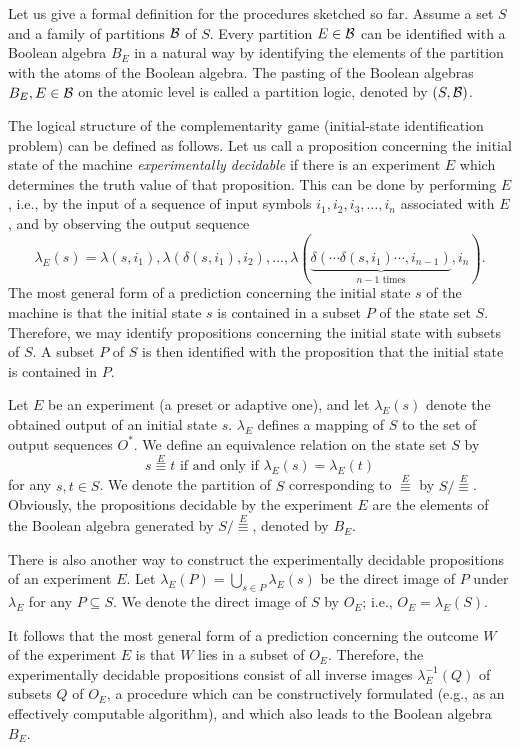\documentclass [11pt]{llncs}
\begin{document}
Let us give a formal definition for the procedures sketched so far.
Assume a set $S$ and a family of partitions ${\cal B}$ of $S$.
Every partition $E\in {\cal B}$ can be identified with a Boolean
algebra $B_E$ in a natural way by identifying the elements of the
partition with the atoms of the Boolean algebra.
The pasting of the Boolean algebras $B_E,E \in {\cal B}$ on the atomic
level is called a partition logic, denoted by $(S,{\cal B})$.


The logical structure of the complementarity game (initial-state
identification problem) can
be defined as follows. Let us call a proposition concerning the initial
state of the machine
{\em experimentally decidable} if there is an experiment $E$ which
determines the truth value of that proposition.
This can be done by performing $E$, i.e., by the input of a sequence of
input symbols $i_1,i_2,i_3,\ldots ,i_n$ associated with $E$, and by
observing the output sequence
$$\lambda_E(s)=\lambda(s,i_1),\lambda(\delta (s,i_1),i_2), \ldots
,\lambda(\underbrace{\delta
(\cdots \delta (s,i_1)\cdots ,i_{n-1})}_{n-1 \mbox{ times}},i_n).$$
The most general form of a prediction concerning the
initial state $s$
of the machine is that the initial state $s$ is contained in a subset
$P$ of the state set $S$.
Therefore, we may identify propositions concerning the initial state
with subsets of $S$.
A subset $P$ of $S$ is then  identified with the proposition that the
initial state is contained in $P$.

Let $E$ be an experiment (a preset or adaptive one), and let
$\lambda_E(s)$
denote the obtained output of an initial
state $s$.
$\lambda_E$ defines a mapping of $S$ to the set of output sequences
$O^*$. We define an equivalence relation on the state set $S$ by
$$s \stackrel{E}{\equiv} t \mbox{ if and only if }\lambda_E(s) =
\lambda_E(t)$$ for any $s,t \in S$.
We denote the partition of $S$ corresponding to $\stackrel{E}{\equiv}$
by $S/\stackrel{E}{\equiv}$.
Obviously, the propositions decidable by the experiment $E$ are
the elements of the Boolean algebra generated by
$S/\stackrel{E}{\equiv}$, denoted by $B_E$.

There is also another way to construct the experimentally decidable
propositions of an experiment $E$.
Let $\lambda_E(P)  = \bigcup\limits_{s \in P}\lambda_E(s)$ be the direct
image of $P$ under $\lambda_E$ for any $P \subseteq S$.
We denote the direct image of $S$ by $O_E$; i.e.,  $O_E = \lambda_E(S)$.

It follows that the most general form of a prediction concerning
the outcome $W$ of the experiment $E$ is that $W$ lies in a subset of
$O_E$.
Therefore, the experimentally decidable propositions consist of all
inverse images $\lambda_E^{-1}(Q)$ of subsets $Q$ of $O_E$,
a procedure which can be constructively formulated (e.g., as an
effectively computable algorithm), and which also
leads to the Boolean algebra $B_E$.
\end{document}
